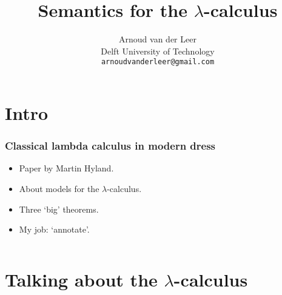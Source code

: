 \documentclass[aspectratio=169]{fancyslides} %
\title{Semantics for the \texorpdfstring{$ \lambda $}{lambda}-calculus}
\author{Arnoud van der Leer\\Delft University of Technology\\\texttt{arnoudvanderleer@gmail.com}}
\begin{document}
  \maketitle

  \section{Intro}

  \begin{frame}
    \frametitle{Classical lambda calculus in modern dress}

    \begin{itemize}
      \item Paper by Martin Hyland.
      \item About models for the $ \lambda $-calculus.
      \item Three `big' theorems.
      \item My job: `annotate'.
    \end{itemize}
  \end{frame}

  \begin{frame}[fragile]
    \begin{columns}
      \begin{column}{.5\textwidth}
        \tableofcontents
      \end{column}
      \begin{column}{.5\textwidth}
      \end{column}
    \end{columns}
  \end{frame}

  \section{Talking about the \texorpdfstring{$\lambda$}{lambda}-calculus}
\end{document}
